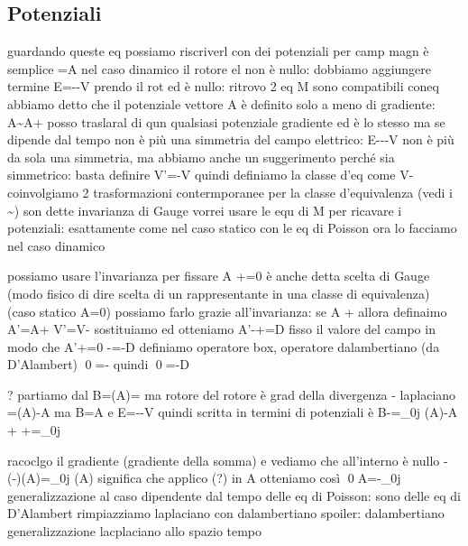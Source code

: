 \subsection{Potenziali}
guardando queste eq possiamo riscriverl con dei potenziali
per camp magn è semplice \vba=\curl\vba A
nel caso dinamico il rotore el non è nullo: dobbiamo aggiungere termine \vba E=--\grad V	prendo il rot ed è nullo: ritrovo 2 eq M
sono compatibili coneq
abbiamo detto che il potenziale vettore \vba A è definito solo a meno di gradiente: \vba A\sim\vba A+\grad\oldphi
posso traslaral di qun qualsiasi potenziale gradiente ed è lo stesso
ma se \oldphi dipende dal tempo non è più una simmetria del campo elettrico: \vba E\rightarrow --\grad{}-\grad V
non è più da sola una simmetria, ma abbiamo anche un suggerimento perché sia simmetrico: basta definire V'=\grad{}-\grad V
quindi definiamo la classe d'eq come V\simV-
coinvolgiamo 2 trasformazioni contermporanee per la classe d'equivalenza (vedi i \sim)
son dette invarianza di Gauge
vorrei usare le equ di M per ricavare i potenziali: esattamente come nel caso statico con le eq di Poisson
ora lo facciamo nel caso dinamico

possiamo usare l'invarianza per fissare \div\vba A +=0 è anche detta scelta di Gauge (modo fisico di dire scelta di un rappresentante in una classe di equivalenza)	(caso statico \div\vba A=0)
possiamo farlo grazie all'invarianza: se \div\vba A +\frac \pdv {}
allora definaimo \vba A'=\vba A+\grad\oldphi
V'=V-
sostituiamo ed otteniamo
\div \vba A'-\laplacian\oldphi +=D
fisso il valore del campo \oldphi in modo che \div \vba A'+=0
\laplacian\oldphi-=-D
definiamo operatore box, operatore dalambertiano (da D'Alambert)
\qed=\laplacian -\frac{}{}
quindi \qed\oldphi=-D

?
partiamo dal \curl\vba B=\grad(\curl\vba A)=
ma rotore del rotore è grad della divergenza - laplaciano
=\grad(\div\vba A)-\laplacian \vba A
ma \vba B=\curl\vba A e \vba E=--\grad V
quindi  scritta in termini di potenziali è
\curl\vba B-=\mu_0\vba j \implies \grad(\div\vba A)-\laplacian\vba A +\frac{}{}  +\frac{}{}\grad{}=\mu_0\vba j

racoclgo il gradiente (gradiente della somma) e vediamo che all'interno è nullo
-(\laplacian -\frac{}{})(\vba A)=\mu_0\vba j
(\vba A) significa che applico (?) in A
otteniamo così \qed\vba A=-\mu_0\vba j
generalizzazione al caso dipendente dal tempo delle eq di Poisson: sono delle eq di D'Alambert
rimpiazziamo laplaciano con dalambertiano
spoiler: dalambertiano generalizzazione lacplaciano allo spazio tempo


